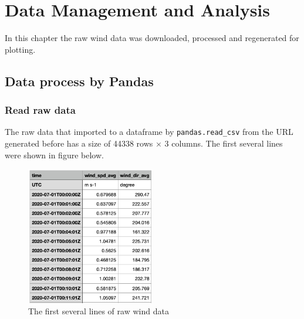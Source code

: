 \documentclass[10pt]{report}
\begin{document}
\chapter{Data Management and Analysis}
In this chapter the raw wind data was downloaded, processed and regenerated for plotting.

\section{Data process by Pandas}

\subsection{Read raw data}
The raw data that imported to a dataframe by \texttt{pandas.read\_csv} from the URL generated before has a size of 44338 rows $\times$ 3 columns. The first several lines were shown in figure below.

\begin{figure}[h!]
    \centering
    \includegraphics[width=0.50\textwidth]{images/raw_data.png}
    \caption{The first several lines of raw wind data}
    \label{fig: PaleBlueDot}    
\end{figure}
\end{document}
